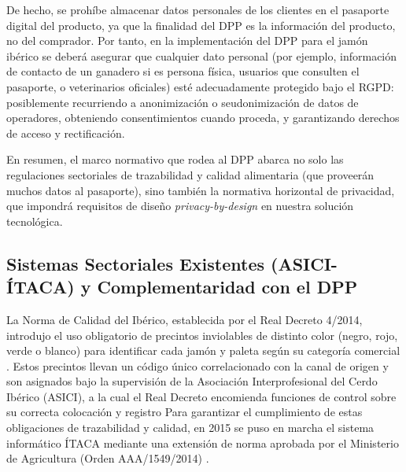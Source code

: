 De hecho, se prohíbe almacenar datos personales de los clientes en el pasaporte digital del producto, ya que la finalidad del DPP es la información del producto, no del comprador. Por tanto, en la implementación del DPP para el jamón ibérico se deberá asegurar que cualquier dato personal (por ejemplo, información de contacto de un ganadero si es persona física, usuarios que consulten el pasaporte, o veterinarios oficiales) esté adecuadamente protegido bajo el RGPD: posiblemente recurriendo a anonimización o seudonimización de datos de operadores, obteniendo consentimientos cuando proceda, y garantizando derechos de acceso y rectificación.

En resumen, el marco normativo que rodea al DPP abarca no solo las regulaciones sectoriales de trazabilidad y calidad alimentaria (que proveerán muchos datos al pasaporte), sino también la normativa horizontal de privacidad, que impondrá requisitos de diseño \textit{privacy-by-design} en nuestra solución tecnológica.

\subsection{Sistemas Sectoriales Existentes (ASICI-ÍTACA) y Complementaridad con el DPP}
La Norma de Calidad del Ibérico, establecida por el Real Decreto 4/2014, introdujo el uso obligatorio de precintos inviolables de distinto color (negro, rojo, verde o blanco) para identificar cada jamón y paleta según su categoría comercial \cite{BOEA2014318RealDecreto}. Estos precintos llevan un código único correlacionado con la canal de origen y son asignados bajo la supervisión de la Asociación Interprofesional del Cerdo Ibérico (ASICI), a la cual el Real Decreto encomienda funciones de control sobre su correcta colocación y registro %
Para garantizar el cumplimiento de estas obligaciones de trazabilidad y calidad, en 2015 se puso en marcha el sistema informático ÍTACA mediante una extensión de norma aprobada por el Ministerio de Agricultura (Orden AAA/1549/2014) \cite{SistemaITACAAsociacion}.

